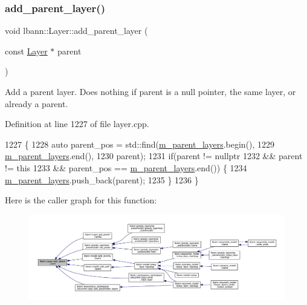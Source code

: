 \subsubsection{\texorpdfstring{add\+\_\+parent\+\_\+layer()}{add\_parent\_layer()}}
{\footnotesize\ttfamily void lbann\+::\+Layer\+::add\+\_\+parent\+\_\+layer (\begin{DoxyParamCaption}\item[{const \hyperlink{classlbann_1_1Layer}{Layer} $\ast$}]{parent }\end{DoxyParamCaption})}

Add a parent layer. Does nothing if parent is a null pointer, the same layer, or already a parent. 

Definition at line 1227 of file layer.\+cpp.


\begin{DoxyCode}
1227                                                 \{
1228   \textcolor{keyword}{auto} parent\_pos = std::find(\hyperlink{classlbann_1_1Layer_a3fa7c6cf1a22bb14ab0e85e3dc6027c5}{m\_parent\_layers}.begin(),
1229                               \hyperlink{classlbann_1_1Layer_a3fa7c6cf1a22bb14ab0e85e3dc6027c5}{m\_parent\_layers}.end(),
1230                               parent);
1231   \textcolor{keywordflow}{if}(parent != \textcolor{keyword}{nullptr}
1232      && parent != \textcolor{keyword}{this}
1233      && parent\_pos == \hyperlink{classlbann_1_1Layer_a3fa7c6cf1a22bb14ab0e85e3dc6027c5}{m\_parent\_layers}.end()) \{
1234     \hyperlink{classlbann_1_1Layer_a3fa7c6cf1a22bb14ab0e85e3dc6027c5}{m\_parent\_layers}.push\_back(parent);
1235   \}
1236 \}
\end{DoxyCode}
Here is the caller graph for this function\+:\nopagebreak
\begin{figure}[H]
\begin{center}
\leavevmode
\includegraphics[width=350pt]{classlbann_1_1Layer_a326668ce624a9bcc719a463820b2e3a4_icgraph}
\end{center}
\end{figure}
\mbox{\label{classlbann_1_1Layer_a8d942eb2cd37c346edc5ff473e0494a2}} 

